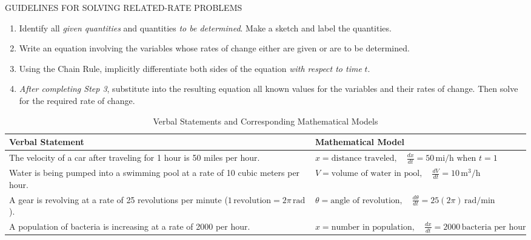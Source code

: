 \documentclass[12pt]{article}
\theoremstyle{beautifulthm}
\begin{document}
\begin{Note}{GUIDELINES FOR SOLVING RELATED-RATE PROBLEMS}{}

\begin{enumerate}
    \item Identify all \textit{given quantities} and quantities \textit{to be determined}. Make a sketch and label the quantities.
    \item Write an equation involving the variables whose rates of change either are given or are to be determined.
    \item Using the Chain Rule, implicitly differentiate both sides of the equation \textit{with respect to time} \( t \).
    \item \textit{After completing Step 3}, substitute into the resulting equation all known values for the variables and their rates of change. Then solve for the required rate of change.
\end{enumerate}
\end{Note}

\begin{table}[h!]
\centering
\renewcommand{\arraystretch}{1.5} %
\begin{tabular}{|p{7cm}|p{7cm}|}
\hline
\textbf{Verbal Statement} & \textbf{Mathematical Model} \\ \hline
The velocity of a car after traveling for 1 hour is 50 miles per hour. & 
\( x = \text{distance traveled}, \quad \frac{dx}{dt} = 50 \, \text{mi/h} \text{ when } t = 1 \) \\ \hline

Water is being pumped into a swimming pool at a rate of 10 cubic meters per hour. & 
\( V = \text{volume of water in pool}, \quad \frac{dV}{dt} = 10 \, \text{m}^3/\text{h} \) \\ \hline

A gear is revolving at a rate of 25 revolutions per minute (\( 1 \, \text{revolution} = 2\pi \, \text{rad} \)). & 
\( \theta = \text{angle of revolution}, \quad \frac{d\theta}{dt} = 25(2\pi) \, \text{rad/min} \) \\ \hline

A population of bacteria is increasing at a rate of 2000 per hour. & 
\( x = \text{number in population}, \quad \frac{dx}{dt} = 2000 \, \text{bacteria per hour} \) \\ \hline
\end{tabular}
\caption{Verbal Statements and Corresponding Mathematical Models}
\end{table}
\end{document}
